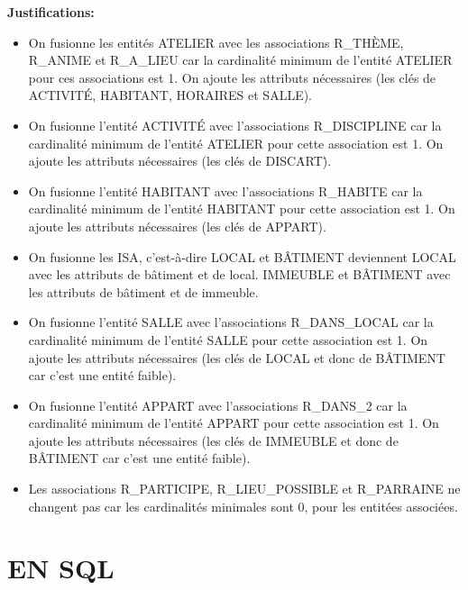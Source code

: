 \documentclass[a4paper,10.5pt]{report}
\begin{document}
	\textbf{Justifications: }
	\begin{itemize}
		\item	On fusionne les entités ATELIER avec les associations R\_THÈME, R\_ANIME et R\_A\_LIEU car la cardinalité minimum de l'entité ATELIER pour ces associations est 1. On ajoute les attributs nécessaires (les clés de ACTIVITÉ, HABITANT, HORAIRES et SALLE).
		\item	On fusionne l'entité ACTIVITÉ avec l'associations R\_DISCIPLINE car la cardinalité minimum de l'entité ATELIER pour cette association est 1. On ajoute les attributs nécessaires (les clés de DISC\. ART\.).
		\item	On fusionne l'entité HABITANT avec l'associations R\_HABITE car la cardinalité minimum de l'entité HABITANT pour cette association est 1. On ajoute les attributs nécessaires (les clés de APPART).
		\item On fusionne les ISA, c'est-à-dire LOCAL et BÂTIMENT deviennent LOCAL avec les attributs de bâtiment et de local. IMMEUBLE et BÂTIMENT avec les attributs de bâtiment et de immeuble.
		\item	On fusionne l'entité SALLE avec l'associations R\_DANS\_LOCAL car la cardinalité minimum de l'entité SALLE pour cette association est 1. On ajoute les attributs nécessaires (les clés de LOCAL et donc de BÂTIMENT car c'est une entité faible). 
		\item	On fusionne l'entité APPART avec l'associations R\_DANS\_2 car la cardinalité minimum de l'entité APPART pour cette association est 1. On ajoute les attributs nécessaires (les clés de IMMEUBLE et donc de BÂTIMENT car c'est une entité faible).
		\item Les associations R\_PARTICIPE, R\_LIEU\_POSSIBLE et R\_PARRAINE ne changent pas car les cardinalités minimales sont 0, pour les entitées associées.

	\end{itemize}
	\newpage
    \section{EN SQL}
\end{document}
